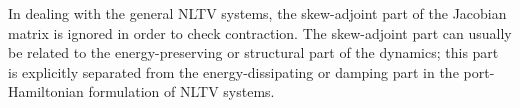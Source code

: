 In dealing with the general NLTV systems, the skew-adjoint part of the Jacobian matrix is ignored in order to check contraction. The skew-adjoint part can usually be related to the energy-preserving or structural part of the dynamics; this part is explicitly separated from the energy-dissipating or damping part in the port-Hamiltonian formulation of NLTV systems. %




\begin{comment}
\subsection{Matrix Measure} \label{sec_matrix_measure}
Consider the vector space $\mathbb{C}^n$ over the field $\mathbb{R}$. The tangent space at every $\vect x\in \mathbb{C}^n$ is the same $\mathbb{C}^n$ space. Let the inner product in the tangent space be $\langle \vect y, \vect x \rangle = \Re\{\vect y^* \vect x\}$ with the associated norm $\|\vect x\| = \sqrt{\langle \vect x, \vect x \rangle}$. A matrix $\matr A \in \mathbb{C}^{n\times n}$, viewed as the linear mapping $\vect x\mapsto \matr A \vect x$, has a matrix measure $\mu(\matr A)$ which is defined as
\begin{equation} \label{E:matrix_measure}
    \mu(\matr A) = \sup_{\vect x \neq 0} \frac{\langle \vect x, \matr A \vect x\rangle}{\langle \vect x, \vect x \rangle} = \sup_{\vect x \neq 0} \frac{\langle \vect x, \frac{1}{2} (\matr A + \matr A^*) \vect x\rangle}{\langle \vect x, \vect x \rangle}.
\end{equation}
It is clear that $\mu(\matr A)$ is equal to the largest eigenvalue of the Hermitian part of $\matr A$: $\frac{1}{2} (\matr A + \matr A^*)$. Hence the matrix measure can be positive or negative, in contrast with the matrix norm induced by a vector norm.


\end{comment}
